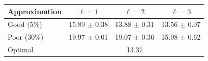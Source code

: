 \begin{tabular}{lccc}
\toprule
Approximation & $\ell=1$ & $\ell=2$ & $\ell=3$ \\
\midrule
Good (5\%) & 15.89 $\pm$ 0.38 & 13.88 $\pm$ 0.31 & 13.56 $\pm$ 0.07 \\
Poor (30\%) & 19.97 $\pm$ 0.01 & 19.07 $\pm$ 0.36 & 15.98 $\pm$ 0.62 \\
\midrule
Optimal & \multicolumn{3}{c}{13.37} \\
\bottomrule
\end{tabular}